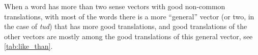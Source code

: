 \documentclass[11pt]{article}
\begin{document}


\todo{missing sense \\ édes [['sweetheart'], ['cute \\
  közvetlen [['informal'], ['casual}


When a word has more than two sense vectors with good non-common translations,
with most of the words there is a more ``general'' vector (or two, in the case
of \emph{tud}) that has more good translations, and good translations of the
other vectors are mostly among the good translations of this general vector,
see \cref{tab:like_than}.
\end{document}
